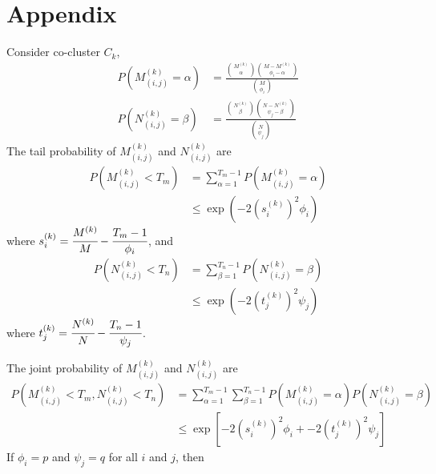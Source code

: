
\appendix
\section*{Appendix}
Consider co-cluster $C_k$,
\begin{align*}
    P(M_{(i,j)}^{(k)} = \alpha) & = \frac{\binom{M^{(k)}}{\alpha} \binom{M-M^{(k)}}{\phi_i-\alpha}}{\binom{M}{\phi_i}} \\
    P(N_{(i,j)}^{(k)} = \beta)  & = \frac{\binom{N^{(k)}}{\beta} \binom{N-N^{(k)}}{\psi_j-\beta}}{\binom{N}{\psi_j}}
\end{align*}
The tail probability of $M_{(i,j)}^{(k)}$ and $N_{(i,j)}^{(k)}$ are
\begin{align*}
    P(M_{(i,j)}^{(k)} < T_m) & = \sum_{\alpha=1}^{T_m-1} P(M_{(i,j)}^{(k)} = \alpha) \\
                             & \le \exp(-2 (s_i^{(k)})^2 \phi_i)
\end{align*}
where $s_i^{(k)} = \cfrac{M^{(k)}}{M}-\cfrac{T_m-1}{\phi_i}$, and
\begin{align*}
    P(N_{(i,j)}^{(k)} < T_n) & = \sum_{\beta=1}^{T_n-1} P(N_{(i,j)}^{(k)} = \beta) \\
                             & \le \exp (-2 (t_j^{(k)})^2 \psi_j)
\end{align*}
where $t_j^{(k)} = \cfrac{N^{(k)}}{N}-\cfrac{T_n-1}{\psi_j}$.

The joint probability of $M_{(i,j)}^{(k)}$ and $N_{(i,j)}^{(k)}$ are
\begin{align*}
    P(M_{(i,j)}^{(k)} < T_m, N_{(i,j)}^{(k)} < T_n) & = \sum_{\alpha=1}^{T_m-1} \sum_{\beta=1}^{T_n-1} P(M_{(i,j)}^{(k)} = \alpha) P(N_{(i,j)}^{(k)} = \beta) \\
                                                    & \le \exp[-2 (s_i^{(k)})^2 \phi_i + -2 (t_j^{(k)})^2 \psi_j]
\end{align*}
If $\phi_i = p$ and $\psi_j = q$ for all $i$ and $j$, then

